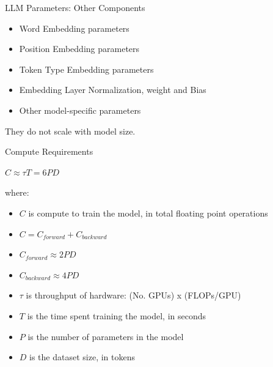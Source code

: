 
\begin{vbframe}{LLM Parameters: Other Components}

\vfill

\begin{itemize}
    \item Word Embedding parameters
    \item Position Embedding parameters
	\item Token Type Embedding parameters
	\item Embedding Layer Normalization, weight and Bias
	\item Other model-specific parameters
\end{itemize}

\vskip5mm

They do not scale with model size.

\vfill

\end{vbframe}


\begin{vbframe}{Compute Requirements}

\vfill

$C \approx \tau T = 6 P D$  \newline

where: \newline

\begin{itemize}
    \item $C$ is compute to train the model, in total floating point operations
    \item $C = C_{forward} + C_{backward}$
	\item $C_{forward} \approx 2 P D$
	\item $C_{backward} \approx 4 P D$
	\item $\tau$ is throughput of hardware: (No. GPUs) x (FLOPs/GPU)
	\item $T$ is the time spent training the model, in seconds
	\item $P$ is the number of parameters in the model
	\item $D$ is the dataset size, in tokens
\end{itemize}

\vfill

\end{vbframe}

